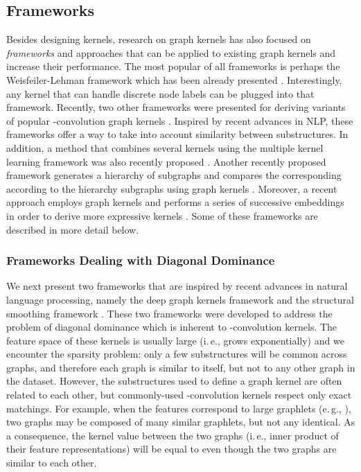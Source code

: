 \documentclass[twoside,11pt]{article}
\newcommand{\eg}{e.\,g., }
\newcommand{\ie}{i.\,e., }
\begin{document}
\subsection{Frameworks}
Besides designing kernels, research on graph kernels has also focused on \textit{frameworks} and approaches that can be applied to existing graph kernels and increase their performance.
The most popular of all frameworks is perhaps the Weisfeiler-Lehman framework which has been already presented .
Interestingly, any kernel that can handle discrete node labels can be plugged into that framework.
Recently, two other frameworks were presented for deriving variants of popular -convolution graph kernels .
Inspired by recent advances in NLP, these frameworks offer a way to take into account similarity between substructures.
In addition, a method that combines several kernels using the multiple kernel learning framework was also recently proposed .
Another recently proposed framework generates a hierarchy of subgraphs and compares the corresponding according to the hierarchy subgraphs using graph kernels .
Moreover, a recent approach employs graph kernels and performs a series of successive embeddings in order to derive more expressive kernels .
Some of these frameworks are described in more detail below.

\subsubsection{Frameworks Dealing with Diagonal Dominance}
We next present two frameworks that are inspired by recent advances in natural language processing, namely the deep graph kernels framework  and the structural smoothing framework . 
These two frameworks were developed to address the problem of diagonal dominance which is inherent to -convolution kernels.
The feature space of these kernels is usually large (\ie grows exponentially) and we encounter the sparsity problem: only a few substructures will be common across graphs, and therefore each graph is similar to itself, but not to any other graph in the dataset.
However, the substructures used to define a graph kernel are often related to each other, but commonly-used -convolution kernels respect only exact matchings. 
For example, when the features correspond to large graphlets (\eg ), two graphs may be composed of many similar graphlets, but not any identical.
As a consequence, the kernel value between the two graphs (\ie inner product of their feature representations) will be equal to  even though the two graphs are similar to each other.
\end{document}

